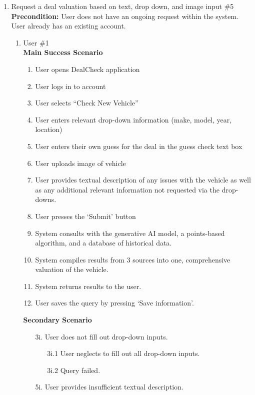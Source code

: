 \documentclass[]{article}
\begin{document}
\begin{enumerate}[{\bf {BE}1.}]
	\item Request a deal valuation based on text, drop down, and image input \#5 \\

	{\bf Precondition:} User does not have an ongoing request within the system. User already has an existing account. 
	\begin{enumerate}[{\bf VP1.}]
		\item User \#1 \\
		{\bf Main Success Scenario}
		\begin{enumerate}[1.]
			\item User opens DealCheck application
			\item User logs in to account
			\item User selects “Check New Vehicle”
			\item User enters relevant drop-down information (make, model, year, location)
			\item User enters their own guess for the deal in the guess check text box
			\item User uploads image of vehicle
			\item User provides textual description of any issues with the vehicle as well as any additional relevant information not requested via the drop-downs.
			\item User presses the ‘Submit’ button
			\item System consults with the generative AI model, a points-based algorithm, and a database of historical data.
			\item System compiles results from 3 sources into one, comprehensive valuation of the vehicle.
			\item System returns results to the user.
			\item User saves the query by pressing ‘Save information’.
		\end{enumerate}
		{\bf Secondary Scenario} \\
            \begin{enumerate}
                \item [3i.] User does not fill out drop-down inputs.
    		\begin{enumerate}
    			\item [3i.1] User neglects to fill out all drop-down inputs.
    			\item [3i.2] Query failed.
    		\end{enumerate}
    		\item [5i.] User provides insufficient textual description.

\end{enumerate}
\end{enumerate}
\end{enumerate}
\end{document}
